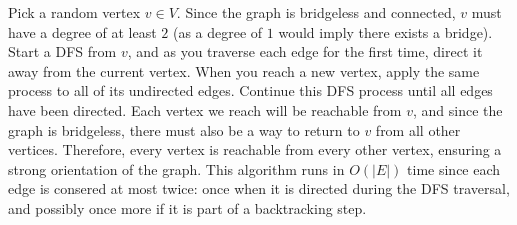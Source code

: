 \documentclass{article}
\begin{document}
\begin{solution}
\begin{enumerate}[label=(\alph*)]
 Pick a random vertex $v \in V$. Since the graph is bridgeless and connected, $v$ must have a degree of at least $2$ (as a degree of $1$ would imply there exists a bridge). Start a DFS from $v$, and as you traverse each edge for the first time, direct it away from the current vertex. When you reach a new vertex, apply the same process to all of its undirected edges. Continue this DFS process until all edges have been directed. Each vertex we reach will be reachable from $v$, and since the graph is bridgeless, there must also be a way to return to $v$ from all other vertices. Therefore, every vertex is reachable from every other vertex, ensuring a strong orientation of the graph. This algorithm runs in $O(|E|)$ time since each edge is consered at most twice: once when it is directed during the DFS traversal, and possibly once more if it is part of a backtracking step.
\end{enumerate}
\end{solution}
\end{document}
